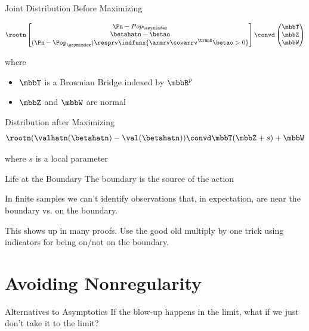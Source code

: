 \documentclass[aspectratio=169, professionalfonts]{beamer}
\begin{document}
\begin{frame}{Joint Distribution Before Maximizing}

	\begin{displaymath}
		\rootn \begin{bmatrix}\Pn - Pop_{\asymindex} \\
			\betahatn - \betao     \\
			(\Pn - \Pop_{\asymindex})\resprv \indfunx{\armrv \covarrv^{\trans}\betao
				> 0}\end{bmatrix} \convd \begin{pmatrix} \mbbT \\ \mbbZ \\
			\mbbW\end{pmatrix}
	\end{displaymath}

	where

	\begin{itemize}
		\item $\mbbT$ is a Brownian Bridge indexed by $\mbbR^p$
		\item $\mbbZ$ and $\mbbW$ are normal
	\end{itemize}
\end{frame}

\begin{frame}{Distribution after Maximizing}
	\begin{displaymath}
		\rootn (\valhatn (\betahatn) - \val(\betahatn)) \convd \mbbT(\mbbZ + s)
		+ \mbbW
	\end{displaymath}

	where $s$ is a local parameter

\end{frame}

\begin{frame}{Life at the Boundary}
	The boundary is the source of the action

	In finite samples we can't identify observations that, in expectation, are
	near the boundary vs. on the boundary.

	This shows up in many proofs. Use the good old multiply by one trick using
	indicators for being on/not on the boundary.

\end{frame}

\section{Avoiding Nonregularity}
\begin{frame}{Alternatives to Asymptotics}
	If the blow-up happens in the limit, what if we just don't take it to the limit?
\end{frame}
\end{document}
